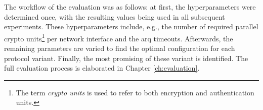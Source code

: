 The workflow of the evaluation was as follows: at first, the hyperparameters were determined once, with the resulting values being used in all
subsequent experiments. These hyperparameters include, e.g., the number of required parallel crypto units\footnote{The term \textit{crypto units} is
used to refer to both encryption and authentication units.} per network interface and the \gls{arq} timeouts. Afterwards, the remaining parameters are
varied to find the optimal configuration for each protocol variant. Finally, the most promising of these variant is identified. The full evaluation
process is elaborated in Chapter \ref{ch:evaluation}. %
